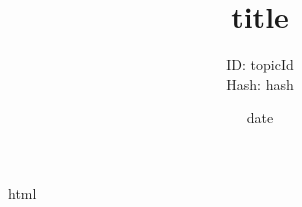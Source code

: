 \documentclass[a4paper,10pt]{article}
\title{{{title}}}
\author{ID: {{topicId}}\\Hash: {{hash}}}
\date{{{date}}\vspace{1cm}}
\begin{document}
\maketitle

{{html}}
\end{document}
